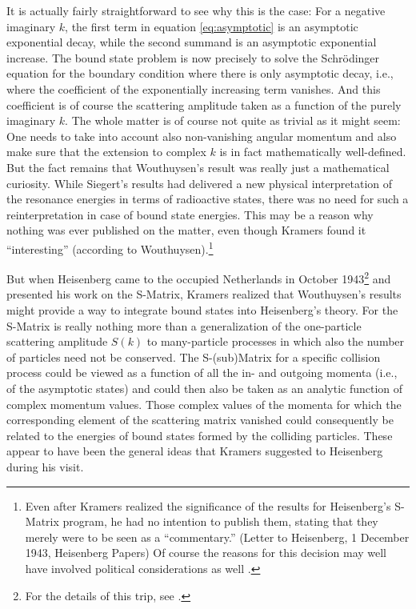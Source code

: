 \documentclass[12pt,a4paper]{article}
\begin{document}
It is actually fairly straightforward to see why this is the case: For a negative imaginary $k$, the first term in equation \ref{eq:asymptotic} is an asymptotic exponential decay, while the second summand is an asymptotic exponential increase. The bound state problem is now precisely to solve the Schr\"{o}dinger equation for the boundary condition where there is only asymptotic decay, i.e., where the coefficient of the exponentially increasing term vanishes. And this coefficient is of course the scattering amplitude taken as a function of the purely imaginary $k$. The whole matter is of course not quite as trivial as it might seem: One needs to take into account also non-vanishing angular momentum and also make sure that the extension to complex $k$ is in fact mathematically well-defined. But the fact remains that Wouthuysen's result was really just a mathematical curiosity. While Siegert's results had delivered a new physical interpretation of the resonance energies in terms of radioactive states, there was no need for such a reinterpretation in case of bound state energies. This may be a reason why nothing was ever published on the matter, even though Kramers found it ``interesting'' (according to Wouthuysen).\footnote{Even after Kramers realized the significance of the results for Heisenberg's S-Matrix program, he had no intention to publish them, stating that they merely were to be seen as a ``commentary.'' (Letter to Heisenberg, 1 December 1943, Heisenberg Papers) Of course the reasons for this decision may well have involved political considerations as well \citep[p. 458]{dresden_1987_h}.}

But when Heisenberg came to the occupied Netherlands in October 1943\footnote{For the details of this trip, see \citep{rechenberg_1989_the-early}.} and presented his work on the S-Matrix, Kramers realized that Wouthuysen's results might provide a way to integrate bound states into Heisenberg's theory. For the S-Matrix is really nothing more than a generalization of the one-particle scattering amplitude $S(k)$ to many-particle processes in which also the number of particles need not be conserved. The S-(sub)Matrix for a specific collision process could be viewed as a function of all the in- and outgoing momenta (i.e., of the asymptotic states) and could then also be taken as an analytic function of complex momentum values. Those complex values of the momenta for which the corresponding element of the scattering matrix vanished could consequently be related to the energies of bound states formed by the colliding particles. These appear to have been the general ideas that Kramers suggested to Heisenberg during his visit.
\end{document}
